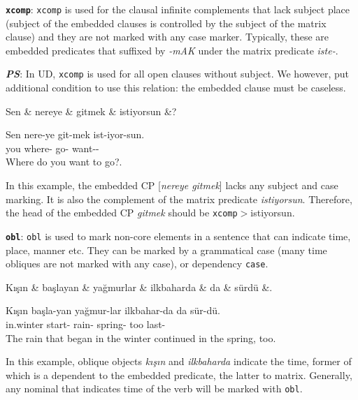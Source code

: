\documentclass[11pt,a4paper]{article}
\begin{document}
\textbf{\texttt{xcomp}}:
\texttt{xcomp} is used for the clausal infinite complements that lack subject place (subject of the embedded clauses is controlled by the subject of the matrix clause) and they are not marked with any case marker. Typically, these are embedded predicates that suffixed by \textit{-mAK} under the matrix predicate \textit{iste-}.

\textit{\textbf{PS}}: In UD, \texttt{xcomp} is used for all open clauses without subject. We however, put additional condition to use this relation: the embedded clause must be caseless.

\begin{exe}
\ex \label{xcomp}
\begin{dependency}
\begin{deptext}
Sen \& nereye \& gitmek \& istiyorsun \&? \\
\end{deptext}
\end{dependency}

\gll Sen nere-ye git-mek ist-iyor-sun. \\
you where-\Dat{} go-\Inf{} want-\Prog{}-\Ssg{} \\
\glt Where do you want to go?.
\end{exe} 

In this example, the embedded CP [\textit{nereye gitmek}] lacks any subject and case marking. It is also the complement of the matrix predicate \textit{istiyorsun}. Therefore, the head of the embedded CP \textit{gitmek} should be \texttt{xcomp}$>$istiyorsun.

\textbf{\texttt{obl}}:
\texttt{obl} is used to mark non-core elements in a sentence that can indicate time, place, manner etc. They can be marked by a grammatical case (many time obliques are not marked with any case), or dependency \texttt{case}. 

\begin{exe}
\ex \label{xcomp}
\begin{dependency}
\begin{deptext}[column sep=0.31cm]
Kışın \& başlayan \& yağmurlar \& ilkbaharda \& da \& sürdü \&. \\
\end{deptext}
\end{dependency}

\gll Kışın başla-yan yağmur-lar ilkbahar-da da sür-dü. \\
in.winter start-\Ptcp{} rain-\Pl{} spring-\Loc{} too last-\Pst{} \\
\glt The rain that began in the winter continued in the spring, too.
\end{exe} 
In this example, oblique objects \textit{kışın} and \textit{ilkbaharda} indicate the time, former of which is a dependent to the embedded predicate, the latter to matrix. Generally, any nominal that indicates time of the verb will be marked with \texttt{obl}.
\end{document}
